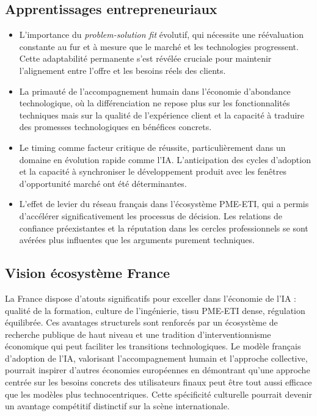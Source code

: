 \subsection{Apprentissages entrepreneuriaux}
\begin{itemize}
    \item L’importance du \textit{problem-solution fit} évolutif, qui nécessite une réévaluation constante au fur et à mesure que le marché et les technologies progressent. Cette adaptabilité permanente s'est révélée cruciale pour maintenir l'alignement entre l'offre et les besoins réels des clients.
    \item La primauté de l’accompagnement humain dans l’économie d’abondance technologique, où la différenciation ne repose plus sur les fonctionnalités techniques mais sur la qualité de l'expérience client et la capacité à traduire des promesses technologiques en bénéfices concrets.
    \item Le timing comme facteur critique de réussite, particulièrement dans un domaine en évolution rapide comme l'IA. L'anticipation des cycles d'adoption et la capacité à synchroniser le développement produit avec les fenêtres d'opportunité marché ont été déterminantes.
    \item L’effet de levier du réseau français dans l’écosystème PME-ETI, qui a permis d'accélérer significativement les processus de décision. Les relations de confiance préexistantes et la réputation dans les cercles professionnels se sont avérées plus influentes que les arguments purement techniques.
\end{itemize}

\subsection{Vision écosystème France}
La France dispose d’atouts significatifs pour exceller dans l’économie de l’IA : qualité de la formation, culture de l’ingénierie, tissu PME-ETI dense, régulation équilibrée. Ces avantages structurels sont renforcés par un écosystème de recherche publique de haut niveau et une tradition d'interventionnisme économique qui peut faciliter les transitions technologiques. Le modèle français d’adoption de l’IA, valorisant l’accompagnement humain et l’approche collective, pourrait inspirer d’autres économies européennes en démontrant qu'une approche centrée sur les besoins concrets des utilisateurs finaux peut être tout aussi efficace que les modèles plus technocentriques. Cette spécificité culturelle pourrait devenir un avantage compétitif distinctif sur la scène internationale.

